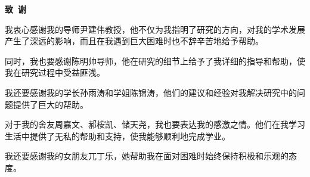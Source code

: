 \cleardoublepage{}
\begin{center}
    \bfseries {} 致~谢
\end{center}

我衷心感谢我的导师尹建伟教授，他不仅为我指明了研究的方向，对我的学术发展产生了深远的影响，而且在我遇到巨大困难时也不辞辛苦地给予帮助。

同时，我也要感谢陈明帅导师，他在研究的细节上给予了我详细的指导和帮助，使我在研究过程中受益匪浅。

我还要感谢我的学长孙雨涛和学姐陈锦涛，他们的建议和经验对我解决研究中的问题提供了巨大的帮助。

对于我的舍友周嘉文、郝桉凯、储天尧，我也要表达我的感激之情。他们在我学习生活中提供了无私的帮助和支持，使我能够顺利地完成学业。

我还要感谢我的女朋友兀丁乐，她帮助我在面对困难时始终保持积极和乐观的态度。